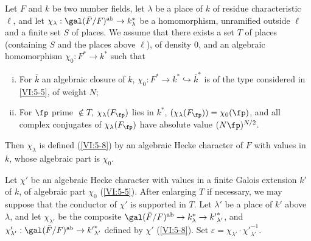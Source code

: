 \begin{theorem_}\label{VI:5-10}
Let $F$ and $k$ be two number fields, let $\lambda$ be a place of $k$ of 
residue characteristic $\ell$, and let 
$\chi_\lambda:\gal(\bar F/F)^\textnormal{ab}\to k_\lambda^\ast$ be a 
homomorphism, unramified outside $\ell$ and a finite set $S$ of 
places. We assume that there exists a set $T$ of places (containing $S$ and the 
places above $\ell$), of density $0$, and an algebraic homomorphism 
$\chi_0:F^\ast \to k^\ast$ such that 
\begin{enumerate}[(i)]
  \item For $\bar k$ an algebraic closure of $k$, 
    $\chi_0:F^\ast \to k^\ast \hookrightarrow \bar k^\ast$ is of the type 
    considered in \ref{VI:5-5}, of weight $N$; 
  
\item {}For $\fp$ prime $\notin T$, $\chi_\lambda(F_\fp)$ lies in 
    $k^\ast$, $(\chi_\lambda(F_\fp))=\chi_0(\fp)$, and all complex conjugates 
    of $\chi_\lambda(F_\fp)$ have absolute value $(N \fp)^{N/2}$. 
\end{enumerate}

Then $\chi_\lambda$ is defined (\ref{VI:5-8}) by an algebraic Hecke character 
of $F$ with values in $k$, whose algebraic part is $\chi_0$. 
\end{theorem_}

Let $\chi'$ be an algebraic Hecke character with values in a 
finite Galois extension $k'$ of $k$, of algebraic part $\chi_0$ 
(\ref{VI:5-5}). After enlarging $T$ if necessary, we may suppose that the conductor of 
$\chi'$ is supported in $T$. Let $\lambda'$ be a place of $k'$ above 
$\lambda$, and let $\chi_{\lambda'}$ be the composite 
$\gal(\bar F/F)^\text{ab}\to k_\lambda^\ast \to {k'}_{\lambda'}^\ast$, and 
$\chi_{\lambda'}':\gal(\bar F/F)^\text{ab}\to {k'}_{\lambda'}^\ast$ defined 
by $\chi'$ (\ref{VI:5-8}). Set 
$\varepsilon = \chi_{\lambda'} \cdot {\chi'}_{\lambda'}^{-1}$.

